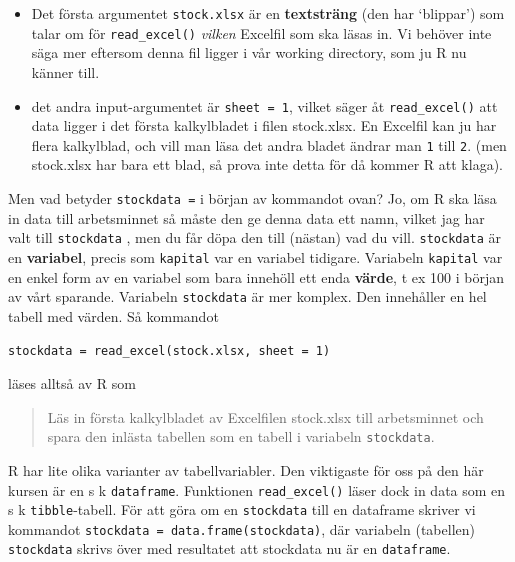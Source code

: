 \documentclass[
  letterpaper,
  DIV=11,
  numbers=noendperiod,
  oneside]{scrartcl}
\providecommand{\tightlist}{%
  \setlength{\itemsep}{0pt}\setlength{\parskip}{0pt}}\usepackage{longtable,booktabs,array}
\begin{document}
\begin{enumerate}
  \begin{itemize}
  \tightlist
  \item
    Det första argumentet
    \texttt{\textquotesingle{}stock.xlsx\textquotesingle{}} är en
    \textbf{textsträng} (den har `blippar') som talar om för
    \texttt{read\_excel()} \emph{vilken} Excelfil som ska läsas in. Vi
    behöver inte säga mer eftersom denna fil ligger i vår working
    directory, som ju R nu känner till.
  \item
    det andra input-argumentet är \texttt{sheet\ =\ 1}, vilket säger åt
    \texttt{read\_excel()} att data ligger i det första kalkylbladet i
    filen stock.xlsx. En Excelfil kan ju har flera kalkylblad, och vill
    man läsa det andra bladet ändrar man \texttt{1} till \texttt{2}.
    (men stock.xlsx har bara ett blad, så prova inte detta för då kommer
    R att klaga).
  \end{itemize}

  Men vad betyder \texttt{stockdata\ =} i början av kommandot ovan? Jo,
  om R ska läsa in data till arbetsminnet så måste den ge denna data ett
  namn, vilket jag har valt till \texttt{stockdata} , men du får döpa
  den till (nästan) vad du vill. \texttt{stockdata} är en
  \textbf{variabel}, precis som \texttt{kapital} var en variabel
  tidigare. Variabeln \texttt{kapital} var en enkel form av en variabel
  som bara innehöll ett enda \textbf{värde}, t ex 100 i början av vårt
  sparande. Variabeln \texttt{stockdata} är mer komplex. Den innehåller
  en hel tabell med värden. Så kommandot

  \texttt{stockdata\ =\ read\_excel(\textquotesingle{}stock.xlsx\textquotesingle{},\ sheet\ =\ 1)}

  läses alltså av R som

  \begin{quote}
  Läs in första kalkylbladet av Excelfilen stock.xlsx till arbetsminnet
  och spara den inlästa tabellen som en tabell i variabeln
  \texttt{stockdata}.
  \end{quote}
\end{enumerate}

R har lite olika varianter av tabellvariabler. Den viktigaste för oss på
den här kursen är en s k \texttt{dataframe}. Funktionen
\texttt{read\_excel()} läser dock in data som en s k
\texttt{tibble}-tabell. För att göra om en \texttt{stockdata} till en
dataframe skriver vi kommandot
\texttt{stockdata\ =\ data.frame(stockdata)}, där variabeln (tabellen)
\texttt{stockdata} skrivs över med resultatet att stockdata nu är en
\texttt{dataframe}.
\end{document}
